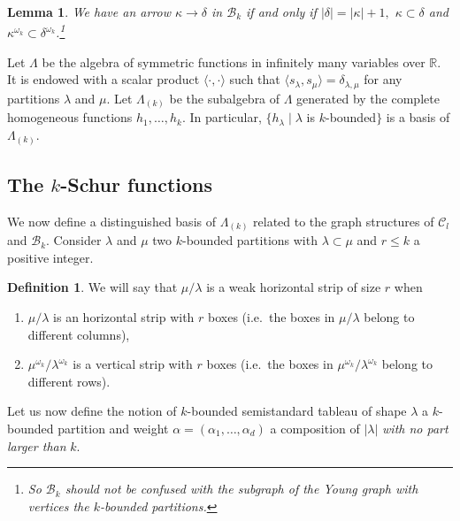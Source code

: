 \documentclass[10pt,a4paper]{amsart}
\newcommand{\ie}{i.e.\ }
\newtheorem{lemma}[theorem]{Lemma}
\theoremstyle{definition}
\newtheorem{defi}[theorem]{Definition}
\begin{document}
\begin{lemma}
We have an arrow $\kappa\rightarrow\delta$ in $\mathcal{B}_{k}$ if and only if
$\left\vert \delta\right\vert =\left\vert \kappa\right\vert +1,$
$\kappa\subset\delta$ and $\kappa^{\omega_{k}}\subset\delta^{\omega_{k}}%
$.\footnote{So $\mathcal{B}_{k}$ \emph{should not be confused} with the
subgraph of the Young graph with vertices the $k$-bounded partitions.}
\end{lemma}

Let $\Lambda$ be the algebra of symmetric functions in infinitely many
variables over $\mathbb{R}$. It is endowed with a scalar product $\langle
\cdot,\cdot\rangle$ such that $\langle s_{\lambda},s_{\mu}\rangle
=\delta_{\lambda,\mu}$ for any partitions $\lambda$ and $\mu$. Let
$\Lambda_{(k)}$ be the subalgebra of $\Lambda$ generated by the complete
homogeneous functions $h_{1},\ldots,h_{k}$. In particular, $\{h_{\lambda}%
\mid\lambda$ is $k$-bounded$\}$ is a basis of $\Lambda_{(k)}$.

\subsection{The \texorpdfstring{$k$}{k}-Schur functions}

We now define a distinguished basis of $\Lambda_{(k)}$ related to the graph
structures of $\mathcal{C}_{l}$ and $\mathcal{B}_{k}$. Consider $\lambda$ and
$\mu$ two $k$-bounded partitions with $\lambda\subset\mu$ and $r\leq k$ a
positive integer.

\begin{defi}
\label{Def_Hori_Strip}We will say that $\mu/\lambda$ is a weak horizontal
strip of size $r$ when

\begin{enumerate}
\item $\mu/\lambda$ is an horizontal strip with $r$ boxes (\ie the boxes in
$\mu/\lambda$ belong to different columns),

\item $\mu^{\omega_{k}}/\lambda^{\omega_{k}}$ is a vertical strip with $r$
boxes (\ie the boxes in $\mu^{\omega_{k}}/\lambda^{\omega_{k}}$ belong to
different rows).
\end{enumerate}
\end{defi}

Let us now define the notion of $k$-bounded semistandard tableau of shape
$\lambda$ a $k$-bounded partition and weight $\alpha=(\alpha_{1},\ldots
,\alpha_{d})$ a composition of $\left\vert \lambda\right\vert $ \emph{with no
part larger than }$k$. 
\end{document}
